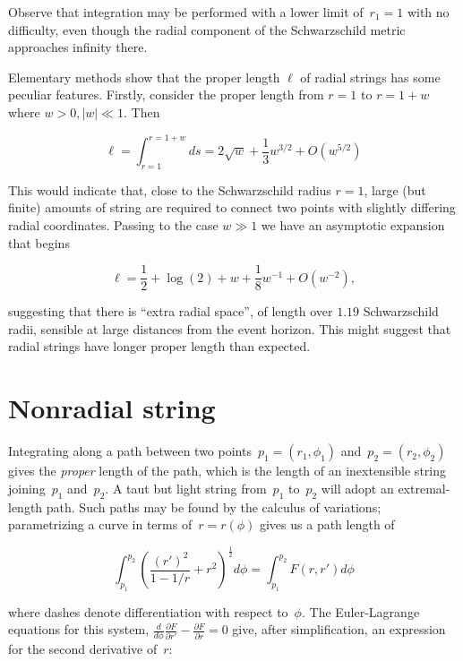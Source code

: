 \documentclass[prb,preprint]{revtex4-1}
\begin{document}
Observe that integration may be performed with a lower limit
of~$r_1=1$ with no difficulty, even though the radial component of the
Schwarzschild metric approaches infinity there.

Elementary methods show that the proper length $\ell$ of radial strings has
some peculiar features.  Firstly, consider the proper length from
$r=1$ to $r=1+w$ where $w>0, \left|w\right|\ll 1$.  Then

\begin{equation}
  \ell=\int_{r=1}^{r=1+w}ds
  =2\sqrt{w} + \frac{1}{3}w^{3/2} + O(w^{5/2})
\end{equation}

This would indicate that, close to the Schwarzschild radius $r=1$,
large (but finite) amounts of string are required to connect two
points with slightly differing radial coordinates.  Passing to the
case $w\gg 1$ we have an asymptotic expansion that begins

\begin{equation}
  \ell  =\frac{1}{2} + \log(2) + w + \frac{1}{8}w^{-1} + O(w^{-2}),
\end{equation}

\noindent suggesting that there is ``extra radial space'', of length
over $1.19$ Schwarzschild radii, sensible at large distances from the
event horizon.  This might suggest that radial strings have longer
proper length than expected.

\section{Nonradial string}
Integrating along a path between two
points~$p_1=\left(r_1,\phi_1\right)$ and~$p_2=\left(r_2,\phi_2\right)$
gives the {\em proper} length of the path, which is the length of an
inextensible string joining~$p_1$ and~$p_2$.  A taut but light string
from~$p_1$ to~$p_2$ will adopt an extremal-length path.  Such paths
may be found by the calculus of variations; parametrizing a curve in
terms of~$r=r\left(\phi\right)$ gives us a path length of

\begin{equation}
  \int_{p_1}^{p_2}\left(\frac{\left(r'\right)^2}{1-1/r} + r^2\right)^\frac{1}{2}d\phi=
  \int_{p_1}^{p_2}F\left(r,r'\right)d\phi
\end{equation}

\noindent where dashes denote differentiation with respect to~$\phi$.  The
Euler-Lagrange equations for this system,
$\frac{d}{d\phi}\frac{\partial F}{\partial r'}-\frac{\partial
  F}{\partial r}=0$ give, after simplification, an expression for the
second derivative of~$r$:
\end{document}
